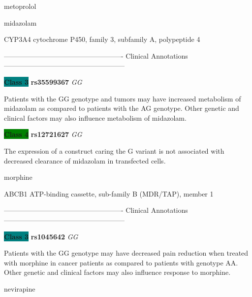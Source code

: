 \documentclass{resume} %
\begin{document}
\begin{rSection}{ metoprolol }
\end{rSection}\begin{rSection}{ midazolam }
\item[]

\begin{rSubsection}{ CYP3A4 }{ cytochrome P450, family 3, subfamily A, polypeptide 4 }{}{}
\item[]

\item[] ---------------------------------------------------- Clinical Annotations -----------------------------------------------------\newline
\item \textbf{\colorbox{teal} {Class 3}} \textbf{ rs35599367 } \textit{ GG }
\item[] Patients with the GG genotype and tumors may have increased metabolism of midazolam as compared to patients with the AG genotype. Other genetic and clinical factors may also influence metabolism of midazolam. \item \textbf{\colorbox{green} {Class 4}} \textbf{ rs12721627 } \textit{ GG }
\item[] The expression of a construct caring the G variant is not associated with decreased clearance of midazolam in transfected cells.
\end{rSubsection}

\end{rSection}\begin{rSection}{ morphine }
\item[]

\begin{rSubsection}{ ABCB1 }{ ATP-binding cassette, sub-family B (MDR/TAP), member 1 }{}{}
\item[]

\item[] ---------------------------------------------------- Clinical Annotations -----------------------------------------------------\newline
\item \textbf{\colorbox{teal} {Class 3}} \textbf{ rs1045642 } \textit{ GG }
\item[] Patients with the GG genotype may have decreased pain reduction when treated with morphine in cancer patients as compared to patients with genotype AA. Other genetic and clinical factors may also influence response to morphine.
\end{rSubsection}

\end{rSection}\begin{rSection}{ nevirapine }
\item[]


\end{rSection}
\end{document}
